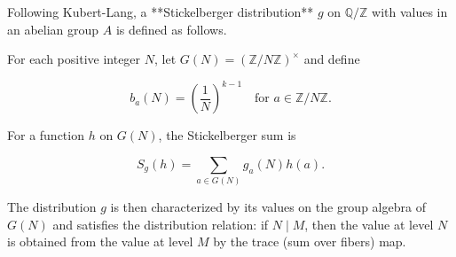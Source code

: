 Following Kubert-Lang, a **Stickelberger distribution** $g$ on $\mathbb{Q}/\mathbb{Z}$ with values in an abelian group $A$ is defined as follows.

For each positive integer $N$, let $G(N) = (\mathbb{Z}/N\mathbb{Z})^\times$ and define

$$
b_a(N) = \left(\frac{1}{N}\right)^{k-1} \quad \text{for } a \in \mathbb{Z}/N\mathbb{Z}.
$$

For a function $h$ on $G(N)$, the Stickelberger sum is

$$
S_g(h) = \sum_{a \in G(N)} g_a(N) h(a).
$$

The distribution $g$ is then characterized by its values on the group algebra of $G(N)$ and satisfies the distribution relation: if $N \mid M$, then the value at level $N$ is obtained from the value at level $M$ by the trace (sum over fibers) map.